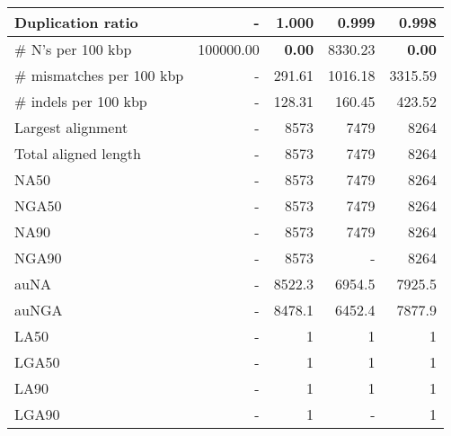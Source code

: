 \documentclass[12pt,a4paper]{article}
\begin{document}
\begin{table}[ht]
\begin{center}
\begin{tabular}{|l*{4}{|r}|}
Duplication ratio & - & 1.000 & 0.999 & 0.998 \\ \hline
\# N's per 100 kbp & 100000.00 & {\bf 0.00} & 8330.23 & {\bf 0.00} \\ \hline
\# mismatches per 100 kbp & - & 291.61 & 1016.18 & 3315.59 \\ \hline
\# indels per 100 kbp & - & 128.31 & 160.45 & 423.52 \\ \hline
Largest alignment & - & 8573 & 7479 & 8264 \\ \hline
Total aligned length & - & 8573 & 7479 & 8264 \\ \hline
NA50 & - & 8573 & 7479 & 8264 \\ \hline
NGA50 & - & 8573 & 7479 & 8264 \\ \hline
NA90 & - & 8573 & 7479 & 8264 \\ \hline
NGA90 & - & 8573 & - & 8264 \\ \hline
auNA & - & 8522.3 & 6954.5 & 7925.5 \\ \hline
auNGA & - & 8478.1 & 6452.4 & 7877.9 \\ \hline
LA50 & - & 1 & 1 & 1 \\ \hline
LGA50 & - & 1 & 1 & 1 \\ \hline
LA90 & - & 1 & 1 & 1 \\ \hline
LGA90 & - & 1 & - & 1 \\ \hline
\end{tabular}
\end{center}
\end{table}
\end{document}
